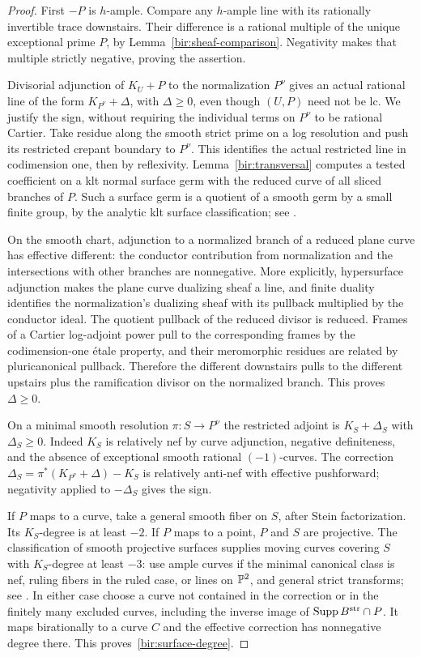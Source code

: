 \begin{proof}
First $-P$ is $h$-ample.  Compare any $h$-ample line with its
rationally invertible trace downstairs.  Their difference is a
rational multiple of the unique exceptional prime $P$, by
Lemma~\ref{bir:sheaf-comparison}.  Negativity makes that multiple
strictly negative, proving the assertion.

Divisorial adjunction of $K_U+P$ to the normalization $P^\nu$ gives
an actual rational line of the form $K_{P^\nu}+\Delta$, with
$\Delta\geq0$, even though $(U,P)$ need not be lc.  We justify the
sign, without requiring the individual terms on $P^\nu$ to be
rational Cartier.  Take residue along the smooth strict prime on a
log resolution and push its restricted crepant boundary to $P^\nu$.
This identifies the actual restricted line in codimension one, then
by reflexivity.  Lemma~\ref{bir:transversal} computes a tested
coefficient on a klt normal surface germ with the reduced curve of
all sliced branches of $P$.  Such a surface germ is a quotient of a
smooth germ by a small finite group, by the analytic klt surface
classification; see \cite[Chapter~4]{BirationalGeometry}.

On the smooth chart, adjunction to a normalized branch of a reduced
plane curve has effective different: the conductor contribution
from normalization and the intersections with other branches are
nonnegative.  More explicitly, hypersurface adjunction makes the
plane curve dualizing sheaf a line, and finite duality identifies the
normalization's dualizing sheaf with its pullback multiplied by the
conductor ideal.  The quotient pullback of the reduced divisor is
reduced.  Frames of a Cartier log-adjoint power pull to the
corresponding frames by the codimension-one \mbox{\'etale} property,
and their meromorphic residues are related by pluricanonical
pullback.  Therefore the different downstairs pulls to the
different upstairs plus the ramification divisor on the normalized
branch.  This proves $\Delta\geq0$.

On a minimal smooth resolution $\pi:S\to P^\nu$ the restricted
adjoint is $K_S+\Delta_S$ with $\Delta_S\geq0$.  Indeed $K_S$ is
relatively nef by curve adjunction, negative definiteness, and the
absence of exceptional smooth rational $(-1)$-curves.  The correction
$\Delta_S=\pi^*(K_{P^\nu}+\Delta)-K_S$ is relatively anti-nef with
effective pushforward; negativity applied to $-\Delta_S$ gives the
sign.

If $P$ maps to a curve, take a general smooth fiber on $S$, after
Stein factorization.  Its $K_S$-degree is at least $-2$.  If $P$ maps
to a point, $P$ and $S$ are projective.  The classification of smooth
projective surfaces supplies moving curves covering $S$ with
$K_S$-degree at least $-3$: use ample curves if the minimal canonical
class is nef, ruling fibers in the ruled case, or lines on $\mathbb{P}^2$,
and general strict transforms; see \cite{BHPV}.  In either case
choose a curve not contained in the correction or in the finitely
many excluded curves, including the inverse image of
$\operatorname{Supp} B^{\mathrm{str}}\cap P$.  It maps birationally to a curve $C$
and the effective correction has nonnegative degree there.  This
proves~\eqref{bir:surface-degree}.
\end{proof}

